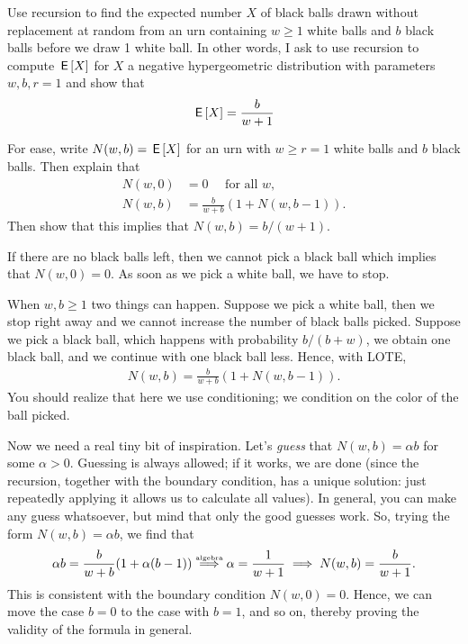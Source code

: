 \begin{exercise}
Use recursion to find the expected number $X$ of black balls drawn without replacement at random from an urn containing $w\geq 1$ white balls and $b$ black balls before we draw 1 white ball.
In other words, I ask to use recursion to compute $\,\mathsf{E}\left[X\right]$ for $X$ a negative hypergeometric distribution with parameters $w,b, r=1$ and show that
\begin{align}
  \label{eq:27}
\,\mathsf{E}\left[X\right] = \frac{b}{w+1}
\end{align}
\begin{hint}
For ease, write $N(w,b)= \,\mathsf{E}\left[X\right]$ for an  urn with $w\geq r = 1$ white balls and $b$ black balls. Then explain that
\begin{align}
N(w, 0) &= 0\quad \text{ for all $w$},\\
  N(w,b) &= \frac{b}{w+b} (1+N(w, b-1)).
\end{align}
Then show that this implies that $N(w,b) = b/ (w+1)$.
\end{hint}
\begin{solution}
If there are no black balls left, then we cannot pick a black ball which implies that $N(w, 0) = 0$.
As soon as we pick a white ball, we have to stop.

When $w, b \geq 1$ two things can happen.
Suppose we pick a white ball, then we stop right away and we cannot increase the number of black balls picked.
Suppose we pick a black ball, which happens with probability $b/(b+w)$, we obtain one black ball, and we continue with one black ball less.
Hence, with LOTE,
\begin{align}
  N(w,b) = \frac{b}{w+b} (1+N(w, b-1)).
\end{align}
You should realize that here we use conditioning; we condition on the color of the ball picked.

Now we need a real tiny bit of inspiration.
Let's \emph{guess} that $N(w,b)=\alpha b$ for some $\alpha>0$.
Guessing is always allowed; if it works, we are done (since the recursion, together with the boundary condition, has a unique solution: just repeatedly applying it allows us to calculate all values).
In general, you can make any guess whatsoever, but mind that only the good guesses work. So, trying the form $N(w,b) = \alpha b$, we find that
\begin{equation*}
\alpha b = \frac{b}{w+b} (1+ \alpha (b-1)) \stackrel{\textrm{\tiny algebra}}{\implies} \alpha = \frac{1}{w+1} \implies  N(w, b) = \frac{b }{w+1}.
\end{equation*}
This is consistent with the boundary condition $N(w,0)=0$. Hence, we can move the case $b=0$ to the case with $b=1$, and so on, thereby proving the validity of the formula in general.
\end{solution}
\end{exercise}

